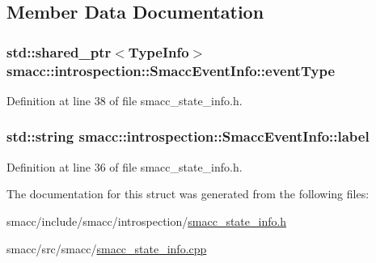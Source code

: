 \subsection{Member Data Documentation}
\subsubsection[{\texorpdfstring{event\+Type}{eventType}}]{\setlength{\rightskip}{0pt plus 5cm}std\+::shared\+\_\+ptr$<${\bf Type\+Info}$>$ smacc\+::introspection\+::\+Smacc\+Event\+Info\+::event\+Type}\hypertarget{structsmacc_1_1introspection_1_1SmaccEventInfo_af3bdf1abf797864e681662d92a5515f9}{}\label{structsmacc_1_1introspection_1_1SmaccEventInfo_af3bdf1abf797864e681662d92a5515f9}


Definition at line 38 of file smacc\+\_\+state\+\_\+info.\+h.

\subsubsection[{\texorpdfstring{label}{label}}]{\setlength{\rightskip}{0pt plus 5cm}std\+::string smacc\+::introspection\+::\+Smacc\+Event\+Info\+::label}\hypertarget{structsmacc_1_1introspection_1_1SmaccEventInfo_a2bbed6ad8013758e23761c92d70c2fd1}{}\label{structsmacc_1_1introspection_1_1SmaccEventInfo_a2bbed6ad8013758e23761c92d70c2fd1}


Definition at line 36 of file smacc\+\_\+state\+\_\+info.\+h.



The documentation for this struct was generated from the following files\+:\begin{DoxyCompactItemize}
\item 
smacc/include/smacc/introspection/\hyperlink{smacc__state__info_8h}{smacc\+\_\+state\+\_\+info.\+h}\item 
smacc/src/smacc/\hyperlink{smacc__state__info_8cpp}{smacc\+\_\+state\+\_\+info.\+cpp}\end{DoxyCompactItemize}
